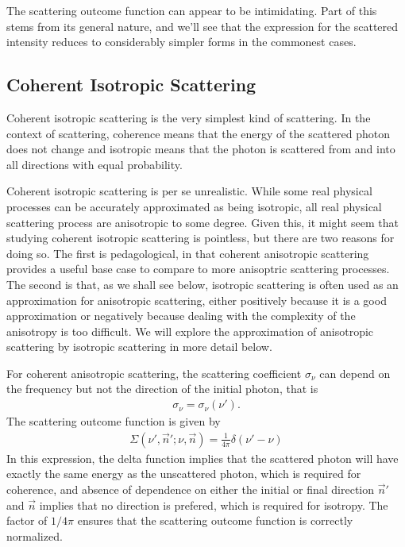 The scattering outcome function can appear to be
intimidating. Part of this stems from its general nature,
and we'll see that the expression for the scattered
intensity reduces to considerably simpler forms in the
commonest cases.

\subsection{Coherent Isotropic Scattering}

Coherent isotropic scattering is the very simplest kind of
scattering. In the context of scattering, coherence means
that the energy of the scattered photon does not change and
isotropic means that the photon is scattered from and into
all directions with equal probability. 

Coherent isotropic scattering is per se unrealistic. While
some real physical processes can be accurately approximated
as being isotropic, all real physical scattering process are
anisotropic to some degree. Given this, it might seem that
studying coherent isotropic scattering is pointless, but
there are two reasons for doing so. The first is
pedagological, in that coherent anisotropic scattering
provides a useful base case to compare to more anisoptric
scattering processes. The second is that, as we shall see
below, isotropic scattering is often used as an
approximation for anisotropic scattering, either positively
because it is a good approximation or negatively because
dealing with the complexity of the anisotropy is too
difficult. We will explore the approximation of anisotropic
scattering by isotropic scattering in more detail below.

For coherent anisotropic scattering, the scattering
coefficient $\sigma_\nu$ can depend on the frequency but not
the direction of the initial photon, that is
\begin{align}
\sigma_\nu = \sigma_\nu(\nu').
\end{align}
The scattering outcome function is given by
\begin{align}
\Sigma(\nu', \vec n'; \nu, \vec n) = \frac{1}{4\pi} \delta(\nu'-\nu)
\end{align}
In this expression, the delta function implies that the
scattered photon will have exactly the same energy as the
unscattered photon, which is required for coherence, and
absence of dependence on either the initial or final
direction $\vec n'$ and $\vec n$ implies that no direction
is prefered, which is required for isotropy. The factor of
$1/4\pi$ ensures that the scattering outcome function is
correctly normalized.

